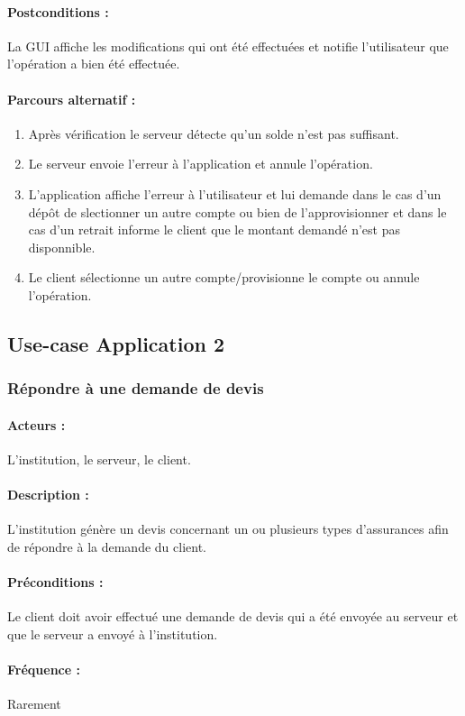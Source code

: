 \documentclass[../annexe.tex]{subfiles}
\begin{document}
\paragraph{Postconditions :}
		La GUI affiche les modifications qui ont été effectuées et notifie l'utilisateur que l'opération a bien été effectuée.
\paragraph{Parcours alternatif :}
\begin{enumerate}
		\item Après vérification le serveur détecte qu'un solde n'est pas suffisant.
		\item Le serveur envoie l'erreur à l'application et annule l'opération.
		\item L'application affiche l'erreur à l'utilisateur et lui demande dans le cas d'un dépôt de slectionner un autre compte ou bien de l'approvisionner et dans le cas d'un retrait informe le
				client que le montant demandé n'est pas disponnible.
		\item Le client sélectionne un autre compte/provisionne le compte ou annule l'opération.
\end{enumerate}
\newpage
\subsection{Use-case Application 2}	

		\subsubsection{Répondre à une demande de devis}
		\paragraph{Acteurs :}
		L'institution, le serveur, le client.
		\paragraph{Description :}
		L'institution génère un devis concernant un ou plusieurs types d'assurances afin de répondre à la demande du client.
		\paragraph{Préconditions :}
		Le client doit avoir effectué une demande de devis qui a été envoyée au serveur et que le serveur a envoyé à l'institution.
		\paragraph{Fréquence :}
		Rarement
\end{document}
